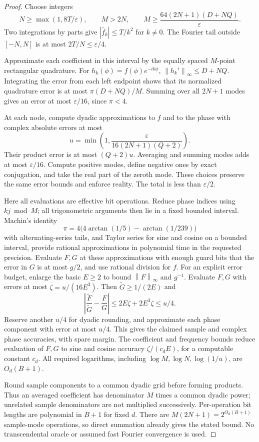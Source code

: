 \documentclass[11pt]{article}
\theoremstyle{remark}\newtheorem{remark}[theorem]{Remark}
\newcommand{\norm}[1]{\left\|#1\right\|_\infty}
\newcommand{\se}{2^{O_d(B+1)}}
\begin{document}
\begin{proof}
Choose integers
\[
 N\geq\max(1,8T/\varepsilon),\qquad
 M>2N,\qquad
 M\geq\frac{64(2N+1)(D+NQ)}{\varepsilon}.
\]
Two integrations by parts give
\(|\widehat f_k|\leq T/k^2\) for \(k\ne0\).
The Fourier tail outside \([-N,N]\) is at most \(2T/N\leq\varepsilon/4\).

Approximate each coefficient in this interval by the equally spaced \(M\)-point rectangular quadrature. For
\(h_k(\phi)=f(\phi)e^{-ik\phi}\),
\(\norm{h_k'}\leq D+NQ\).
Integrating the error from each left endpoint shows that its normalized quadrature error is at most
\(\pi(D+NQ)/M\). Summing over all \(2N+1\) modes gives an error at most \(\varepsilon/16\), since \(\pi<4\).

At each node, compute dyadic approximations to \(f\) and to the phase with complex absolute errors at most
\[
          u=\min\left(1,\frac{\varepsilon}{16(2N+1)(Q+2)}\right).
\]
Their product error is at most \((Q+2)u\). Averaging and summing modes adds at most \(\varepsilon/16\). Compute positive modes, define negative ones by exact conjugation, and take the real part of the zeroth mode. These choices preserve the same error bounds and enforce reality. The total is less than \(\varepsilon/2\).

Here all evaluations are effective bit operations. Reduce phase indices using \(kj\bmod M\); all trigonometric arguments then lie in a fixed bounded interval. Machin's identity
\[
        \pi=4\bigl(4\arctan(1/5)-\arctan(1/239)\bigr)
\]
with alternating-series tails, and Taylor series for sine and cosine on a bounded interval, provide rational approximations in polynomial time in the requested precision. Evaluate \(F,G\) at these approximations with enough guard bits that the error in \(G\) is at most \(g/2\), and use rational division for \(f\). For an explicit error budget, enlarge the basic \(E\geq2\) to bound \(\norm F\) and \(g^{-1}\). Evaluate \(F,G\) with errors at most \(\zeta=u/(16E^3)\). Then \(\widetilde G\geq1/(2E)\) and
\[
 \left|\frac{\widetilde F}{\widetilde G}-\frac FG\right|
 \leq 2E\zeta+2E^3\zeta\leq u/4.
\]
Reserve another \(u/4\) for dyadic rounding, and approximate each phase component with error at most \(u/4\). This gives the claimed sample and complex phase accuracies, with spare margin. The coefficient and frequency bounds reduce evaluation of \(F,G\) to sine and cosine accuracy \(\zeta/(c_dE)\), for a computable constant \(c_d\). All required logarithms, including \(\log M,\log N,\log(1/u)\), are \(O_d(B+1)\).

Round sample components to a common dyadic grid before forming products. Thus an averaged coefficient has denominator \(M\) times a common dyadic power; unrelated sample denominators are not multiplied successively. Per-operation bit lengths are polynomial in \(B+1\) for fixed \(d\). There are \(M(2N+1)=\se\) sample-mode operations, so direct summation already gives the stated bound. No transcendental oracle or assumed fast Fourier convergence is used.
\end{proof}
\end{document}
